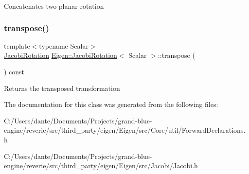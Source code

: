 Concatenates two planar rotation \mbox{\label{class_eigen_1_1_jacobi_rotation_ab40e9cdc4582593511e57ee896e055a2}} 
\subsubsection{\texorpdfstring{transpose()}{transpose()}}
{\footnotesize\ttfamily template$<$typename Scalar$>$ \\
\mbox{\hyperlink{class_eigen_1_1_jacobi_rotation}{Jacobi\+Rotation}} \mbox{\hyperlink{class_eigen_1_1_jacobi_rotation}{Eigen\+::\+Jacobi\+Rotation}}$<$ Scalar $>$\+::transpose (\begin{DoxyParamCaption}{ }\end{DoxyParamCaption}) const\hspace{0.3cm}{\ttfamily [inline]}}

Returns the transposed transformation 

The documentation for this class was generated from the following files\+:\begin{DoxyCompactItemize}
\item 
C\+:/\+Users/dante/\+Documents/\+Projects/grand-\/blue-\/engine/reverie/src/third\+\_\+party/eigen/\+Eigen/src/\+Core/util/Forward\+Declarations.\+h\item 
C\+:/\+Users/dante/\+Documents/\+Projects/grand-\/blue-\/engine/reverie/src/third\+\_\+party/eigen/\+Eigen/src/\+Jacobi/Jacobi.\+h\end{DoxyCompactItemize}
